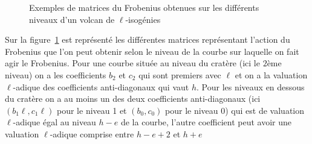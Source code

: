 \documentclass[10pt,a4paper]{book}
\theoremstyle{plain}
\theoremstyle{definition}
\theoremstyle{definition}
\theoremstyle{definition}
\theoremstyle{definition}
\theoremstyle{remark}
\theoremstyle{remark}
\theoremstyle{definition}
\begin{document}
\begin{figure}
\begin{center}
\end{center}
\caption{\label{fig:atk:dif:niv:mat} Exemples de matrices du Frobenius obtenues sur les différents niveaux d'un volcan de $\ell$-isogénies}
\end{figure}
Sur la figure~\ref{fig:atk:dif:niv:mat} est représenté les différentes matrices
représentant l'action du Frobenius que l'on peut obtenir selon le niveau de la 
courbe sur laquelle on fait agir le Frobenius. Pour une courbe située au niveau
du cratère (ici le $2$ème niveau) on a les coefficients $b_2$ et $c_2$ qui sont
premiers avec $\ell$ et on a la valuation $\ell$-adique des coefficients 
anti-diagonaux qui vaut $h$. Pour les niveaux en dessous du cratère on a au 
moins un des deux coefficients anti-diagonaux (ici $(b_1\ell,c_1\ell)$ pour le 
niveau 1 et $(b_0,c_0)$ pour le niveau $0$) qui est de valuation $\ell$-adique 
égal au niveau $h-e$ de la courbe, l'autre coefficient peut avoir une valuation 
$\ell$-adique comprise entre $h-e+2$ et $h+e$ 
\end{document}
